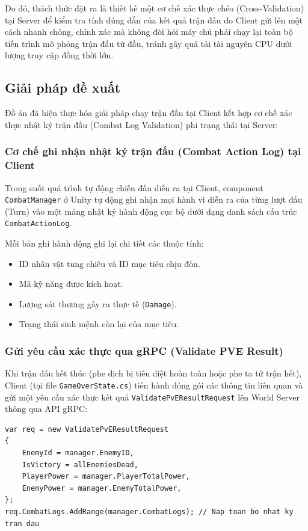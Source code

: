 \documentclass[../Project.tex]{subfiles}
\begin{document}
Do đó, thách thức đặt ra là thiết kế một cơ chế xác thực chéo (Cross-Validation) tại Server để kiểm tra tính đúng đắn của kết quả trận đấu do Client gửi lên một cách nhanh chóng, chính xác mà không đòi hỏi máy chủ phải chạy lại toàn bộ tiến trình mô phỏng trận đấu từ đầu, tránh gây quá tải tài nguyên CPU dưới lượng truy cập đồng thời lớn.

\subsection{Giải pháp đề xuất}
Đồ án đã hiện thực hóa giải pháp chạy trận đấu tại Client kết hợp cơ chế xác thực nhật ký trận đấu (Combat Log Validation) phi trạng thái tại Server:

\subsubsection{Cơ chế ghi nhận nhật ký trận đấu (Combat Action Log) tại Client}
Trong suốt quá trình tự động chiến đấu diễn ra tại Client, component \texttt{CombatManager} ở Unity tự động ghi nhận mọi hành vi diễn ra của từng lượt đấu (Turn) vào một mảng nhật ký hành động cục bộ dưới dạng danh sách cấu trúc \texttt{CombatActionLog}. 

Mỗi bản ghi hành động ghi lại chi tiết các thuộc tính:
\begin{itemize}
    \item ID nhân vật tung chiêu và ID mục tiêu chịu đòn.
    \item Mã kỹ năng được kích hoạt.
    \item Lượng sát thương gây ra thực tế (\texttt{Damage}).
    \item Trạng thái sinh mệnh còn lại của mục tiêu.
\end{itemize}

\subsubsection{Gửi yêu cầu xác thực qua gRPC (Validate PVE Result)}
Khi trận đấu kết thúc (phe địch bị tiêu diệt hoàn toàn hoặc phe ta tử trận hết), Client (tại file \texttt{GameOverState.cs}) tiến hành đóng gói các thông tin liên quan và gửi một yêu cầu xác thực kết quả \texttt{ValidatePvEResultRequest} lên World Server thông qua API gRPC:
\begin{lstlisting}[language={[Sharp]C}, breaklines=true]
var req = new ValidatePvEResultRequest
{
    EnemyId = manager.EnemyID,
    IsVictory = allEnemiesDead,
    PlayerPower = manager.PlayerTotalPower,
    EnemyPower = manager.EnemyTotalPower,
};
req.CombatLogs.AddRange(manager.CombatLogs); // Nap toan bo nhat ky tran dau
\end{lstlisting}
\end{document}
